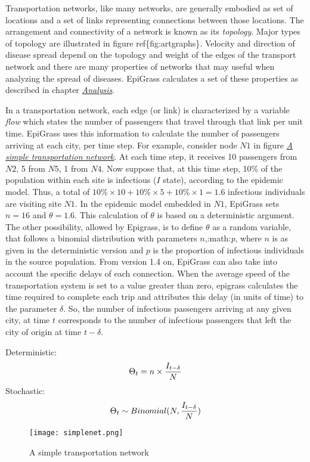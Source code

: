 \documentclass[a4paper,10pt,english]{sphinxmanual}
\begin{document}
Transportation networks, like many networks, are generally embodied as
set of locations and a set of links representing connections between
those locations. The arrangement and connectivity of a network is
known as its \emph{topology}. Major types of topology are
illustrated in figure ref\{fig:artgraphs\}. Velocity and direction of
disease spread depend on the topology and weight of the edges of the
transport network and there are many properties of networks that may
useful when analyzing the spread of diseases. EpiGrass calculates a
set of these properties as described in chapter {\hyperref[analysis:analysis]{\emph{Analysis}}}.

In a transportation network, each edge (or link) is characterized by a variable \emph{flow} which states the number of passengers that travel through that link per unit time. EpiGrass uses this information to calculate the number of passengers arriving at each city, per time step. For example, consider node \(N1\) in figure {\hyperref[intromodels:simpnet]{\emph{A simple transportation network}}}. At each time step, it receives 10 passengers from \(N2\), 5 from \(N5\), 1 from \(N4\). Now suppose that, at this time step, 10\% of the population within each site is infectious (\(I\) state), according to the epidemic model. Thus, a total of \(10\% \times 10 + 10\% \times 5 + 10\% \times 1 = 1.6\) infectious individuals are visiting site \(N1\). In the epidemic model embedded in \(N1\), EpiGrass sets \(n = 16\) and \(\theta = 1.6\). This calculation of \(\theta\) is based on a deterministic argument. The other possibility, allowed by Epigrass, is to define \(\theta\) as a random variable, that follows a binomial distribution with parameters \(n\),:math:\emph{p}, where \(n\) is as given in the deterministic version and \(p\) is the proportion of infectious individuals in the source population. From version 1.4 on, EpiGrass can also take into account the specific delays of each connection. When the average speed of the transportation system is set to a value greater than zero, epigrass calculates the time required to complete each trip and attributes this delay (in units of time) to the parameter \(\delta\). So, the number of infectious passengers arriving at any given city, at time \(t\) corresponds to the number of infectious passengers that left the city of origin at time \(t-\delta\).

Deterministic:
\begin{gather}
\begin{split}\Theta_t=n\times\frac{I_{t-\delta}}{N}\end{split}\notag
\end{gather}
Stochastic:
\begin{gather}
\begin{split}\Theta_t \sim Binomial(N,\frac{I_{t-\delta}}{N})\end{split}\notag
\end{gather}\begin{figure}[htbp]
\centering
\capstart

\texttt{[image: simplenet.png]}
\caption{A simple transportation network}\label{intromodels:simpnet}\end{figure}
\end{document}
